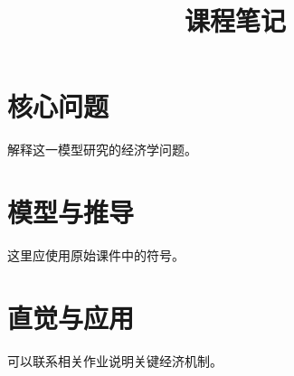 \documentclass[11pt]{ctexart}
\title{课程笔记}
\author{}
\date{}
\begin{document}
\maketitle

\section{核心问题}
解释这一模型研究的经济学问题。

\section{模型与推导}
这里应使用原始课件中的符号。

\section{直觉与应用}
可以联系相关作业说明关键经济机制。
\end{document}
